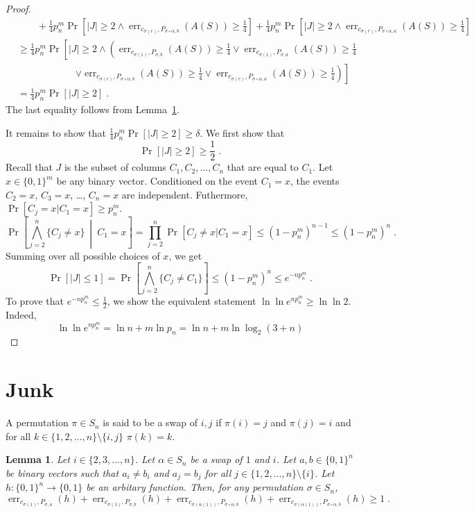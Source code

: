 \documentclass[10pt]{article}
\newtheorem{lemma}[proposition]{Lemma}
\DeclareMathOperator{\err}{err}
\begin{document}
\begin{proof}
\begin{align*}
& \qquad + \frac{1}{4} p_n^m \Pr \left[ |J| \ge 2 \wedge \err_{c_{\sigma(r)},P_{\sigma \circ \alpha, b}}(A(S)) \ge \frac{1}{4} \right] + \frac{1}{4} p_n^m \Pr \left[ |J| \ge 2 \wedge \err_{c_{\sigma(r)},P_{\sigma \circ \alpha, a}}(A(S)) \ge \frac{1}{4} \right] \\
& \ge \frac{1}{4} p_n^m \Pr \left[ |J| \ge 2 \wedge \left( \err_{c_{\sigma(1)},P_{\sigma, b}}(A(S)) \ge \frac{1}{4} \vee \err_{c_{\sigma(1)},P_{\sigma, a}}(A(S)) \ge \frac{1}{4} \right. \right. \\
& \qquad \qquad \qquad \left. \left. \vee \err_{c_{\sigma(r)},P_{\sigma \circ \alpha, b}}(A(S)) \ge \frac{1}{4} \vee \err_{c_{\sigma(r)},P_{\sigma \circ \alpha, a}}(A(S)) \ge \frac{1}{4} \right) \right] \\
& = \frac{1}{4} p_n^m \Pr \left[ |J| \ge 2 \right] \; .
\end{align*}
The last equality follows from Lemma~\ref{lemma:projection-distances}.

It remains to show that $\frac{1}{4} p_n^m \Pr \left[ |J| \ge 2 \right] \ge \delta$.
We first show that
$$
\Pr \left[ |J| \ge 2 \right] \ge \frac{1}{2} \; .
$$
Recall that $J$ is the subset of columns $C_1, C_2, \dots, C_n$ that are equal
to $C_1$. Let $x \in \{0,1\}^m$ be any binary vector. Conditioned on the event
$C_1 = x$, the events $C_2 = x$, $C_3 = x$, \dots, $C_n = x$ are independent.
Futhermore, $\Pr[C_j = x | C_1 = x] \ge p_n^m$.
$$
\Pr \left[ \bigwedge_{j=2}^n \{C_j \neq x\} ~\middle|~ C_1 = x \right] = \prod_{j=2}^n \Pr[C_j \neq x | C_1 = x] \le (1 - p_n^m)^{n-1} \le (1 - p_n^m)^n \; .
$$
Summing over all possible choices of $x$, we get
$$
\Pr[|J| \le 1] = \Pr \left[ \bigwedge_{j=2}^n \{C_j \neq C_1\} \right] \le (1 - p_n^m)^n \le e^{-n p_n^m} \; .
$$
To prove that $e^{-n p_n^m} \le \frac{1}{2}$, we show the equivalent statement $\ln \ln e^{n p_n^m} \ge \ln \ln 2$.
Indeed,
$$
\ln \ln e^{n p_n^m} = \ln n + m \ln p_n = \ln n + m \ln \log_2(3+n)
$$
\end{proof}

\section{Junk}

A permutation $\pi \in S_n$ is said to be a swap of $i,j$
if $\pi(i) = j$ and $\pi(j) = i$ and for all $k \in \{1,2,\dots,n\} \setminus \{i,j\}$
$\pi(k) = k$.

\begin{lemma}
\label{lemma:projection-distances}
Let $i \in \{2,3,\dots,n\}$. Let $\alpha \in S_n$ be a swap of $1$ and $i$.
Let $a,b \in \{0,1\}^n$ be binary vectors such that $a_i \neq b_i$
and $a_j = b_j$ for all $j \in \{1,2,\dots,n\} \setminus \{i\}$.
Let $h:\{0,1\}^n \to \{0,1\}$ be an arbitary function. Then, for any permutation $\sigma \in S_n$,
$$
\err_{c_{\sigma(1)},P_{\sigma,a}}(h) + \err_{c_{\sigma(1)},P_{\sigma,b}}(h) +
\err_{c_{\sigma(\alpha(1))},P_{\sigma \circ \alpha,b}}(h) + \err_{c_{\sigma(\alpha(1))},P_{\sigma \circ \alpha,b}}(h) \ge 1 \; .
$$
\end{lemma}
\end{document}
